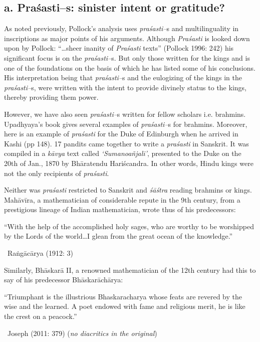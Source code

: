\begin{itemize}
\end{itemize}


\subsection*{a. Praśasti–s: sinister intent or gratitude?}

As noted previously, Pollock’s analysis uses \textit{praśasti–}s and multilinguality in inscriptions as major points of his arguments. Although \textit{Praśasti} is looked down upon by Pollock: “…sheer inanity of \textit{Praśasti} texts” (Pollock 1996: 242) his significant focus is on the \textit{praśasti–}s. But only those written for the kings and is one of the foundations on the basis of which he has listed some of his conclusions. His interpretation being that \textit{praśasti–}s and the eulogizing of the kings in the \textit{praśasti–}s, were written with the intent to provide divinely status to the kings, thereby providing them power.

However, we have also seen \textit{praśasti–}s written for fellow scholars i.e. brahmins. Upadhyaya’s book gives several examples of \textit{praśasti–}s for brahmins. Moreover, here is an example of \textit{praśasti} for the Duke of Edinburgh when he arrived in Kashi (pp 148). 17 pandits came together to write a \textit{praśasti} in Sanskrit. It was compiled in a \textit{kāvya} text called \textit{‘Sumanoañjali’}, presented to the Duke on the 20th of Jan., 1870 by Bhāratendu Hariścandra. In other words, Hindu kings were not the only recipients of \textit{praśasti}.

Neither was \textit{praśasti} restricted to Sanskrit and \textit{śāśtra} reading brahmins or kings. Mahāvīra, a mathematician of considerable repute in the 9th century, from a prestigious lineage of Indian mathematician, wrote thus of his predecessors:

\begin{myquote}
“With the help of the accomplished holy sages, who are worthy to be worshipped by the Lords of the world…I glean from the great ocean of the knowledge.” 

~\hfill Raṅgācārya (1912: 3)
\end{myquote}

Similarly, Bhāskarā II, a renowned mathematician of the 12th century had this to say of his predecessor Bhāskarāchārya:

\begin{myquote}
“Triumphant is the illustrious Bhaskaracharya whose feats are revered by the wise and the learned. A poet endowed with fame and religious merit, he is like the crest on a peacock.” 

~\hfill Joseph (2011: 379) (\textit{no diacritics in the original})
\end{myquote}

